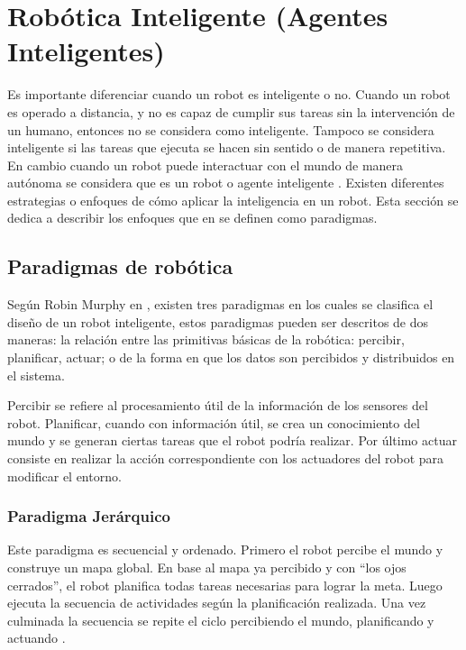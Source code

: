 \section{Robótica Inteligente (Agentes Inteligentes)} \label{sect:AgentesInteligentes}

Es importante diferenciar cuando un robot es inteligente o no. Cuando un robot es operado a distancia, y no es capaz de cumplir sus tareas sin la intervención de un humano, entonces no se considera como inteligente. Tampoco se considera inteligente si las tareas que ejecuta se hacen sin sentido o de manera repetitiva. En cambio cuando un robot puede interactuar con el mundo de manera autónoma se considera que es un robot o agente inteligente \cite{AiRobotics}. Existen diferentes estrategias o enfoques de cómo aplicar la inteligencia en un robot. Esta sección se dedica a describir los enfoques que en  \cite{AiRobotics} se definen como paradigmas.   
   
\subsection{Paradigmas de robótica}
Según Robin Murphy en \cite{AiRobotics}, existen tres paradigmas en los cuales se clasifica el diseño de un robot inteligente, estos paradigmas pueden ser descritos de dos maneras: la relación entre las primitivas básicas de la robótica:  percibir, planificar, actuar; o de la forma en que los datos son percibidos y distribuidos en el sistema.

Percibir se refiere al procesamiento útil de la información de los sensores del robot. Planificar, cuando con información útil, se crea un conocimiento del mundo y se generan ciertas tareas que el robot podría realizar. Por último actuar consiste en realizar la acción correspondiente con los actuadores del robot para modificar el entorno. 

\subsubsection{Paradigma Jerárquico}

Este paradigma es secuencial y ordenado. Primero el robot percibe el mundo y construye un mapa global. En base al mapa ya percibido y con “los ojos cerrados”, el robot planifica todas tareas necesarias para lograr la meta. Luego ejecuta la secuencia de actividades según la planificación realizada. Una vez culminada la secuencia se repite el ciclo percibiendo el mundo, planificando y actuando \cite{AiRobotics}.


